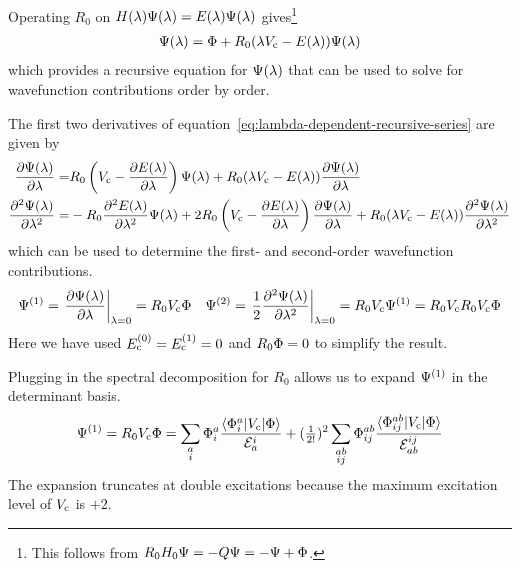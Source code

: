 \documentclass[11pt]{article}
\numberwithin{equation}{section}
\begin{document}
\begin{samepage}
\begin{rmk}
Operating $R_0$ on $H(\lambda )\Psi (\lambda )=E(\lambda )\Psi (\lambda )$ gives\footnote{This follows from $R_0H_0\Psi =-Q\Psi =-\Psi +\Phi $.}
\begin{align}
\label{eq:lambda-dependent-recursive-series}
  \Psi (\lambda )
=
  \Phi 
+
  R_0
  (
    \lambda  V_{\mathrm{c}}
  -
    E(\lambda )
  )
  \Psi (\lambda )
\end{align}
which provides a recursive equation for $\Psi (\lambda )$ that can be used to solve for wavefunction contributions order by order.
\end{rmk}
\end{samepage}

\begin{ex}
The first two derivatives of equation~\ref{eq:lambda-dependent-recursive-series} are given by
\begin{align*}
  \frac {\partial\Psi (\lambda )}{\partial\lambda }
=&
  R_0
  \left(
    V_{\mathrm{c}}
  -
    \frac {\partial E(\lambda )}{\partial\lambda }
  \right)
  \Psi (\lambda )
+
  R_0
  (
    \lambda  V_{\mathrm{c}}
  -
    E(\lambda )
  )
  \frac {\partial\Psi (\lambda )}{\partial\lambda }
\\
  \frac {\partial^2\Psi (\lambda )}{\partial\lambda ^2}
=&
-
  R_0
  \frac {\partial^2E(\lambda )}{\partial\lambda ^2}
  \Psi (\lambda )
+
  2
  R_0
  \left(
    V_{\mathrm{c}}
  -
    \frac {\partial E(\lambda )}{\partial\lambda }
  \right)
  \frac {\partial\Psi (\lambda )}{\partial\lambda }
+
  R_0
  (
    \lambda  V_{\mathrm{c}}
  -
    E(\lambda )
  )
  \frac {\partial^2\Psi (\lambda )}{\partial\lambda ^2}
\end{align*}
which can be used to determine the first- and second-order wavefunction contributions.
\begin{align}
\label{eq:first-and-second-order-principal-terms}
  \Psi ^{(1)}
=
  \left.
  \frac {\partial\Psi (\lambda )}{\partial\lambda }
  \right|_{\lambda =0}
=
  R_0
  V_{\mathrm{c}}
  \Phi 
&&
  \Psi ^{(2)}
=
  \left.
  \frac {1}{2}
  \frac {\partial^2\Psi (\lambda )}{\partial\lambda ^2}
  \right|_{\lambda =0}
=
  R_0
  V_{\mathrm{c}}
  \Psi ^{(1)}
=
  R_0
  V_{\mathrm{c}}
  R_0
  V_{\mathrm{c}}
  \Phi 
\end{align}
Here we have used $E_{\mathrm{c}}^{(0)}=E_{\mathrm{c}}^{(1)}=0$ and $R_0\Phi =0$ to simplify the result.
\end{ex}

\begin{ex}
\label{ex:first-order-wavefunction-expansion-unsimplified}
Plugging in the spectral decomposition for $R_0$ allows us to expand $\Psi ^{(1)}$ in the determinant basis.
\begin{align}
\label{eq:first-order-wavefunction-expansion-unsimplified}
  \Psi ^{(1)}
=
  R_0
  V_{\mathrm{c}}
  \Phi 
=
  \sum_{\substack{a\\i}}
  \Phi _i^a
  \frac {\langle\Phi _i^a|V_{\mathrm{c}}|\Phi \rangle}{\mathcal{E}_a^i}
+
  (\tfrac{1}{2!})^2
  \sum_{\substack{ab\\ij}}
  \Phi _{ij}^{ab}
  \frac {\langle\Phi _{ij}^{ab}|V_{\mathrm{c}}|\Phi \rangle}{\mathcal{E}_{ab}^{ij}}
\end{align}
The expansion truncates at double excitations because the maximum excitation level of $V_{\mathrm{c}}$ is $+2$.
\end{ex}
\end{document}
